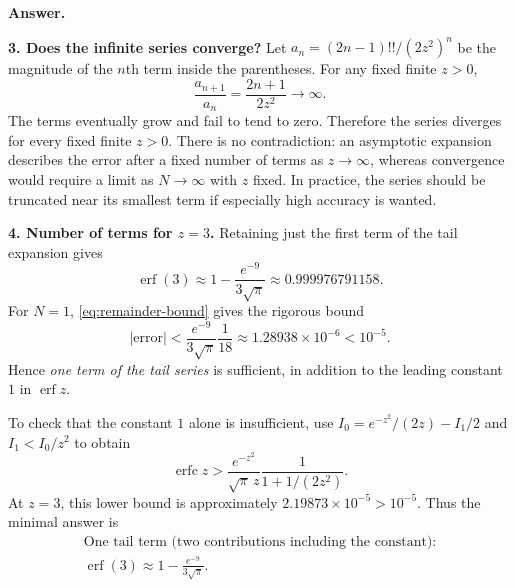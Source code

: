 \documentclass[11pt,a4paper]{article}
\newcounter{question}[section]
\newcommand{\homework}[1]{%
  \clearpage
  \section{Homework #1}%
  \setcounter{question}{0}%
  \setcounter{equation}{0}%
}
\newenvironment{question}{%
  \refstepcounter{question}%
  \subsection*{Question \arabic{question}}%
  \addcontentsline{toc}{subsection}{Question \arabic{question}}%
}{\par}
\newenvironment{answer}{\par\medskip\textbf{Answer.}\par}{\par\medskip}
\DeclareMathOperator{\erf}{erf}
\DeclareMathOperator{\erfc}{erfc}
\begin{document}
\begin{answer}
\textbf{3. Does the infinite series converge?}
Let $a_n=(2n-1)!!/(2z^2)^n$ be the magnitude of the $n$th term
inside the parentheses. For any fixed finite $z>0$,
\[
  \frac{a_{n+1}}{a_n}=\frac{2n+1}{2z^2}\longrightarrow\infty.
\]
The terms eventually grow and fail to tend to zero. Therefore the
series diverges for every fixed finite $z>0$.
There is no contradiction: an asymptotic expansion describes the
error after a fixed number of terms as $z\to\infty$, whereas
convergence would require a limit as $N\to\infty$ with $z$ fixed.
In practice, the series should be truncated near its smallest term
if especially high accuracy is wanted.

\textbf{4. Number of terms for $z=3$.}
Retaining just the first term of the tail expansion gives
\[
  \erf(3)\approx1-\frac{e^{-9}}{3\sqrt{\pi}}
              \approx0.999976791158.
\]
For $N=1$, \eqref{eq:remainder-bound} gives the rigorous bound
\[
  |\text{error}|<\frac{e^{-9}}{3\sqrt{\pi}}\frac1{18}
               \approx1.28938\times10^{-6}<10^{-5}.
\]
Hence \emph{one term of the tail series} is sufficient, in addition
to the leading constant $1$ in $\erf z$.

To check that the constant $1$ alone is insufficient, use
$I_0=e^{-z^2}/(2z)-I_1/2$ and
$I_1<I_0/z^2$ to obtain
\[
  \erfc z>
  \frac{e^{-z^2}}{\sqrt{\pi}\,z}
  \frac{1}{1+1/(2z^2)}.
\]
At $z=3$, this lower bound is approximately
$2.19873\times10^{-5}>10^{-5}$.
Thus the minimal answer is
\[
  \boxed{\begin{gathered}
    \text{One tail term (two contributions including the constant):}\\
    \erf(3)\approx1-\frac{e^{-9}}{3\sqrt{\pi}}.
  \end{gathered}}
\]
\end{answer}

%
%
\end{document}
